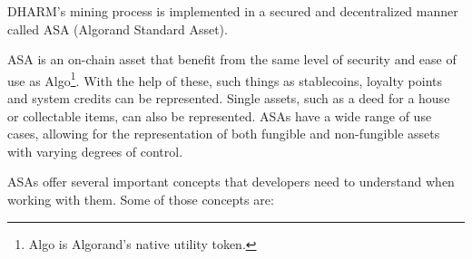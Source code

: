 DHARM's mining process is implemented in a secured and decentralized manner called ASA (Algorand Standard Asset).\newline

ASA is an on-chain asset that benefit from the same level of security and ease of use as Algo\footnote{Algo is Algorand's native utility token.}. With the help of these, such things as stablecoins, loyalty points and system credits can be represented. Single assets, such as a deed for a house or collectable items, can also be represented. ASAs have a wide range of use cases, allowing for the representation of both fungible and non-fungible assets with varying degrees of control. \newline

ASAs offer several important concepts that developers need to understand when working with them. Some of those concepts are:

